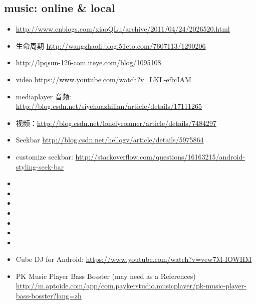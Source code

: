 \documentclass[9pt,b5paper]{article}
\begin{document}
\subsection{music: online \& local}
\label{sec-2-1}
\begin{itemize}
\item \url{http://www.cnblogs.com/xiaoQLu/archive/2011/04/24/2026520.html}
\item 生命周期 \url{http://wangzhaoli.blog.51cto.com/7607113/1290206}
\item \url{http://lpqsun-126-com.iteye.com/blog/1095108}
\item video \url{https://www.youtube.com/watch?v=LKL-efbiIAM}
\item mediaplayer 音频: \url{http://blog.csdn.net/siyehuazhilian/article/details/17111265}
\item 视频：\url{http://blog.csdn.net/lonelyroamer/article/details/7484297}
\item Seekbar \url{http://blog.csdn.net/hellogv/article/details/5975864}
\item customize seekbar: \url{http://stackoverflow.com/questions/16163215/android-styling-seek-bar}
\item 
\item 
\item 
\item 
\item 
\item 
\item 
\item Cube DJ for Android: \url{https://www.youtube.com/watch?v=vew7M-IOWHM}
\item PK Music Player Bass Bosster (may need as a References) \url{http://m.aptoide.com/app/com.paykerstudio.musicplayer/pk-music-player-bass-bosster?lang=zh}
\end{itemize}
\end{document}

